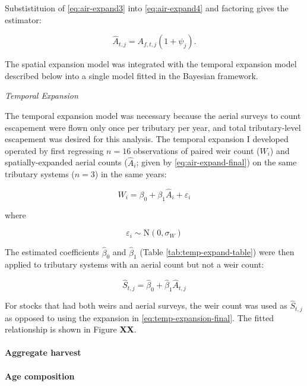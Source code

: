 \documentclass[12pt,]{book}
\let\oldparagraph\paragraph
\renewcommand{\paragraph}[1]{\oldparagraph{#1}\mbox{}}
\theoremstyle{definition}
\theoremstyle{definition}
\theoremstyle{definition}
\theoremstyle{remark}
\begin{document}
\noindent
Substistituion of \eqref{eq:air-expand3} into \eqref{eq:air-expand4} and
factoring gives the estimator:

\begin{equation}
  \hat{A}_{t,j}=A_{f,t,j}(1 + \psi_j).
  \label{eq:air-expand-final}
\end{equation}

The spatial expansion model was integrated with the temporal expansion
model described below into a single model fitted in the Bayesian
framework.

\noindent
\emph{Temporal Expansion}

\noindent
The temporal expansion model was necessary because the aerial surveys to
count escapement were flown only once per tributary per year, and total
tributary-level escapement was desired for this analysis. The temporal
expansion I developed operated by first regressing \(n = 16\)
observations of paired weir count (\(W_i\)) and spatially-expanded
aerial counts (\(\hat{A}_{i}\); given by \eqref{eq:air-expand-final}) on
the same tributary systems (\(n = 3\)) in the same years:

\[W_i = \beta_0 + \beta_1 \hat{A}_i + \varepsilon_i\]

\noindent
where

\[\varepsilon_i \sim \text{N}(0,\sigma_W)\]

The estimated coefficients \(\hat{\beta}_0\) and \(\hat{\beta}_1\)
(Table \ref{tab:temp-expand-table}) were then applied to tributary
systems with an aerial count but not a weir count:

\[\hat{S}_{t,j}=\hat{\beta}_0 + \hat{\beta}_1 \hat{A}_{t,j} \]

For stocks that had both weirs and aerial surveys, the weir count was
used as \(\hat{S}_{t,j}\) as opposed to using the expansion in
\eqref{eq:temp-expansion-final}. The fitted relationship is shown in
Figure \textbf{XX}.

\paragraph{Aggregate harvest}\label{aggregate-harvest}

\paragraph{Age composition}\label{age-composition}
\end{document}
